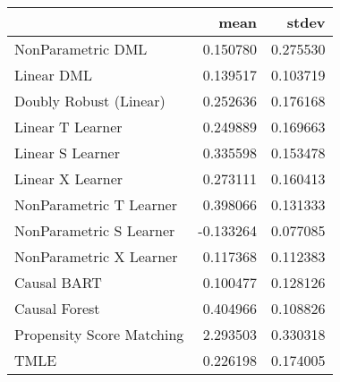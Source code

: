 \begin{tabular}{lrr}
\toprule
{} &      mean &     stdev \\
\midrule
NonParametric DML         &  0.150780 &  0.275530 \\
Linear DML                &  0.139517 &  0.103719 \\
Doubly Robust (Linear)    &  0.252636 &  0.176168 \\
Linear T Learner          &  0.249889 &  0.169663 \\
Linear S Learner          &  0.335598 &  0.153478 \\
Linear X Learner          &  0.273111 &  0.160413 \\
NonParametric T Learner   &  0.398066 &  0.131333 \\
NonParametric S Learner   & -0.133264 &  0.077085 \\
NonParametric X Learner   &  0.117368 &  0.112383 \\
Causal BART               &  0.100477 &  0.128126 \\
Causal Forest             &  0.404966 &  0.108826 \\
Propensity Score Matching &  2.293503 &  0.330318 \\
TMLE                      &  0.226198 &  0.174005 \\
\bottomrule
\end{tabular}
